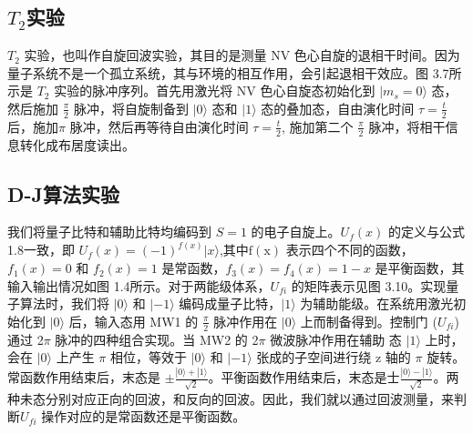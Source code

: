 \documentclass[a4paper,UTF8]{ctexart}
\begin{document}
\subsection{$T_2$实验}

$T_{2}$ 实验，也叫作自旋回波实验，其目的是测量 NV 色心自旋的退相干时间。因为量子系统不是一个孤立系统，其与环境的相互作用，会引起退相干效应。图 3.7所示是 $T_{2}$ 实验的脉冲序列。首先用激光将 NV 色心自旋态初始化到 $|m_s=0\rangle$ 态，然后施加 $\frac\pi2$ 脉冲，将自旋制备到 $|0\rangle$ 态和 $|1\rangle$ 态的叠加态，自由演化时间 $\tau=\frac t2$ 后，施加$\pi$ 脉冲，然后再等待自由演化时间 $\tau=\frac t2$, 施加第二个 $\frac\pi2$ 脉冲，将相干信息转化成布居度读出。

\subsection{D-J算法实验}

我们将量子比特和辅助比特均编码到 $S=1$ 的电子自旋上。$U_f(x)$ 的定义与公式 1.8一致，即 $U_f(x)=(-1)^{f(x)}|x\rangle$,其中$\mathrm{f( x) }$ 表示四个不同的函数，$f_1(x)=0$ 和 $f_2(x)=1$ 是常函数，$f_3(x)=f_4(x)=1-x$ 是平衡函数，其输入输出情况如图 1.4所示。对于两能级体系，$U_{fi}$ 的矩阵表示见图 3.10。实现量子算法时，我们将 $|0\rangle$ 和 $|-1\rangle$ 编码成量子比特，$|1\rangle$ 为辅助能级。在系统用激光初始化到 $|0\rangle$ 后，输入态用 MW1 的 $\frac\pi2$ 脉冲作用在 $|0\rangle$ 上而制备得到。控制门 ($U_{fi}$) 通过 2$\pi$ 脉冲的四种组合实现。当 MW2 的 2$\pi$ 微波脉冲作用在辅助
态 $|1\rangle$ 上时，会在 $|0\rangle$ 上产生 $\pi$ 相位，等效于 $|0\rangle$ 和 $|-1\rangle$ 张成的子空间进行绕 z 轴的 $\pi$ 旋转。常函数作用结束后，末态是 $\pm\frac{|0\rangle+|1\rangle}{\sqrt{2}}$。平衡函数作用结束后，末态是士$\frac{|0\rangle-|1\rangle}{\sqrt{2}}$。两种未态分别对应正向的回波，和反向的回波。因此，我们就以通过回波测量，来判断$U_{fi}$ 操作对应的是常函数还是平衡函数。
\end{document}
